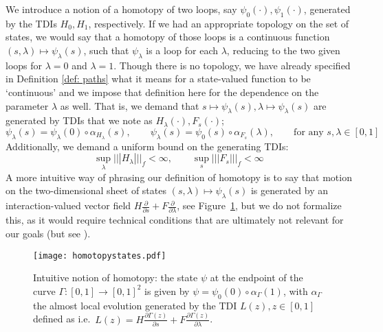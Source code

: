 We introduce a notion of a homotopy of two loops, say $\psi_0(\cdot),\psi_1(\cdot)$, generated by the TDIs $H_0, H_1$, respectively. 
If we had an appropriate topology on the set of states, we would say that a homotopy of those loops is a continuous function $(s,\lambda)\mapsto \psi_\lambda(s)$, such that $\psi_\lambda$ is a loop for each $\lambda$, reducing to the two given loops for $\lambda=0$ and $\lambda=1$. 
Though there is no topology,  we have  already specified in Definition \ref{def: paths} what it means for a state-valued function to be `continuous' and we impose that definition here for the dependence on the parameter $\lambda$ as well.  That is, we demand that $s\mapsto \psi_\lambda(s),\lambda\mapsto \psi_\lambda(s) $ are generated by TDIs that we note as $H_\lambda(\cdot), F_s(\cdot)$;
\begin{equation}\label{eq: homotopy}
\psi_\lambda(s)= \psi_\lambda(0) \circ \alpha_{H_\lambda}(s),\qquad
\psi_\lambda(s)= \psi_0(s) \circ \alpha_{F_s}(\lambda),\qquad \text{for any $s, \lambda \in[0,1]$}
\end{equation}
Additionally, we demand a uniform bound on the generating TDIs:
\begin{equation}\label{Homotopy: Uniform bound}
\sup_{\lambda} ||| H_\lambda |||_f <  \infty,\qquad \sup_s  ||| F_s |||_f  <\infty
\end{equation}
A more intuitive way of phrasing our definition of homotopy is to say that motion on the 
two-dimensional sheet of states $(s,\lambda)\mapsto \psi_\lambda(s)$ is generated by an interaction-valued vector field $H\frac{\partial}{\partial s} + F\frac{\partial}{\partial \lambda} $, see Figure~\ref{fig: homotopy states}, but we do not formalize this, as it would require technical conditions that are ultimately not relevant for our goals (but see \cite{kapustin2022local}).

\begin{figure}[h]
	\begin{center}
		\texttt{[image: homotopystates.pdf]}
		\caption{Intuitive notion of homotopy: the state $\psi$ at the endpoint of the curve $\Gamma: [0,1]\to [0,1]^2$ is given by  $\psi=\psi_0(0)\circ \alpha_\Gamma(1)$, with $\alpha_\Gamma$ the almost local evolution generated by the TDI $L(z), z\in [0,1]$  defined as i.e.\  
			$L(z)= H\frac{\partial \Gamma(z)}{\partial s} + F\frac{\partial \Gamma(z)}{\partial \lambda} $. }
		\label{fig: homotopy states}
	\end{center}
\end{figure} 

